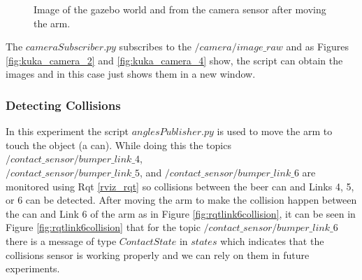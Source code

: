 \documentclass[12pt,oneside]{article}
\begin{document}
\begin{figure}[H]
  \centering
  \hfill
  \caption{Image of the gazebo world and from the camera sensor after moving the arm.}
\end{figure}

The $cameraSubscriber.py$ subscribes to the $/camera/image\_raw$ and as Figures \ref{fig:kuka_camera_2} and \ref{fig:kuka_camera_4} show, the script can obtain the images and in this case just shows them in a new window.

\subsubsection{Detecting Collisions}\label{experiment:detecting-collisions}
In this experiment the script $anglesPublisher.py$ is used to move the arm to touch the object (a can). While doing this the topics $/contact\_sensor/bumper\_link\_4$, \\ $/contact\_sensor/bumper\_link\_5$, and $/contact\_sensor/bumper\_link\_6$ are monitored using Rqt \ref{rviz_rqt} so collisions between the beer can and Links 4, 5, or 6 can be detected.
After moving the arm to make the collision happen between the can and Link 6 of the arm as in Figure \ref{fig:rqtlink6collision}, it can be seen in Figure \ref{fig:rqtlink6collision} that for the topic $/contact\_sensor/bumper\_link\_6$ there is a message of type $ContactState$ in $states$ which indicates that the collisions sensor is working properly and we can rely on them in future experiments.
\end{document}
